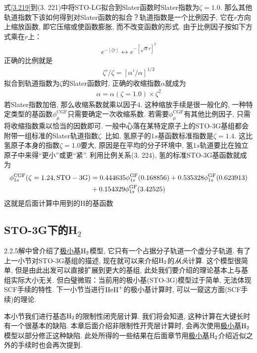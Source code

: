 式\eqref{3.219}到(3.
221)中将STO-LG拟合到Slater函数时Slater指数为$\zeta=1.0$. 
那么其他轨道指数下该如何得到对Slater函数的拟合？轨道指数是一个比例因子, 
它在$r$方向上缩放函数, 
即它压缩或使函数膨胀, 
而不改变函数的形式. 
由于比例因子按如下方式乘在$r$上：
\begin{align}
	e^{-[\zeta r]} \leftrightarrow e^{-[\sqrt{\alpha}r]^2}
\end{align}
正确的比例就是
\begin{align}
	\zeta'/\zeta=[\alpha'/\alpha]^{1/2}
\end{align}
拟合到轨道指数为$\zeta$的Slater函数时, 
正确的收缩指数$\alpha$就成为
\begin{align}
	\alpha = \alpha(\zeta=1.0)\times \zeta^2
\end{align}
若Slater指数加倍, 
那么收缩系数就乘以因子$4$. 
这种缩放手续是很一般化的, 
一种特定类型的基函数$\phi_\mu^\mathrm{CGF}$只需要确定一次收缩系数. 
若需要$\phi_\mu^\mathrm{CGF}$有其他比例因子, 
只需将收缩指数乘以恰当的因数即可. 
一般中心落在某特定原子上的STO-3G基组都会附带一组标准的Slater轨道指数$\zeta$. 
比如, 
氢原子的$1s$基函数标准指数是$\zeta=1.4$. 
这比氢原子本身的指数$\zeta=1.0$要大, 
原因是在平均的分子环境中, 
氢$1s$轨道要比在独立原子中来得``更小”或更``紧”. 
利用比例关系(3.
224), 
氢的标准STO-3G基函数就成为
\begin{align}
	\label{3.225}
	\phi_{1s}^\mathrm{CGF}(\zeta=1.24,\mathrm{STO-3G}) & = 0.444635\phi_{1s}^\mathrm{GF}(0.168856) + 0.535328\phi_{1s}^\mathrm{GF}(0.623913) \notag\\
	& + 0.154329\phi_{1s}^\mathrm{GF}(3.42525)
\end{align}
这就是后面计算中用到的$\mathrm{H}$的基函数
\subsection{STO-3G下的H$_2$}
2.2.5解中曾介绍了\underline{极小基$\mathrm{H}_2$}模型, 它只有一个占据分子轨道一个虚分子轨道. 
有了上一小节对STO-3G基组的描述, 现在就可以来介绍$\mathrm{H}_2$的\emph{从头}\hft 计算. 
这个模型很简单, 但是由此出发可以直接扩展到更大的基组, 此处我们要介绍的\hft 理论基本上与基组实际大小无关. 
但白璧微瑕：当前用的极小基(STO-3G)模型过于简单, 无法体现SCF手续的特性. 
下一小节当进行$\mathrm{HeH}^+$的极小基计算时, 可以一窥这方面(SCF手续)的\hft 理论.

本小节我们进行基态$\mathrm{H}_2$的限制性闭壳层计算. 
我们将会知道, 
这种计算在大键长时有一个很基本的缺陷. 
本章后面介绍非限制性开壳层计算时, 
会再次使用\underline{极小基$\mathrm{H}_2$}模型以部分修正这种缺陷. 
此处所得的一些结果在后面章节用\underline{极小基$\mathrm{H}_2$}介绍\hft 近似之外的手续时也会再次提到.


